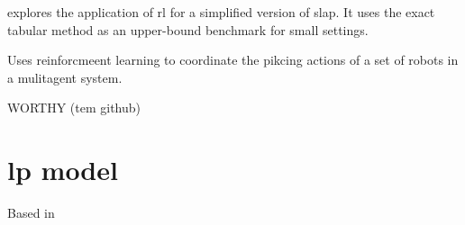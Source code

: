 \documentclass[a4paper,twoside,11pt]{article}
\begin{document}
\cite{niu2019model} explores the application of \gls{rl} for a simplified version of \gls{slap}. It uses the exact tabular method as an upper-bound benchmark for small settings.

\cite{wu2024deep} Uses reinforcmeent learning to coordinate the pikcing actions of a set of robots in a mulitagent system.


WORTHY
\cite{moccia2009column}
\cite{li2016dynamic}
\cite{niu2019model}(tem github)





\newpage

\section{\gls{lp} model}

Based in \cite{moccia2009column}

\newcommand{\Task}{k}
\newcommand{\TaskB}{u}
\newcommand{\TaskSet}{K}
\newcommand{\Product}{p}
\newcommand{\ProductSet}{P}
\newcommand{\Location}{m}
\newcommand{\LocationB}{l}
\newcommand{\LocationSet}{M}
\newcommand{\IncompatibleSet}{U}
\newcommand{\Period}{t}
\newcommand{\PeriodSet}{T}

\newcommand{\BinaryTaskProduct}{f}
\newcommand{\x}{x}
\newcommand{\y}{y}
\newcommand{\In}{o}
\newcommand{\Out}{d}
\newcommand{\Arrival}{a}
\newcommand{\Departure}{b}
\newcommand{\TravelTime}{c}
\newcommand{\Distance}{s}
\newcommand{\TaskSize}{q}
\newcommand{\LocationCapacity}{Q}
\newcommand{\MinDistance}{\delta}
\newcommand{\ShelvingTime}{s}
\newcommand{\PickingTime}{p}
\newcommand{\LimitReallocations}{L}


\newcommand{\Assignment}{z}
\newcommand{\Reallocation}{w}
\newcommand{\UsedCapacity}{h}
\newcommand{\Available}{A}
\end{document}
